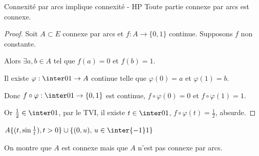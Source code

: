 \begin{proposition}{Connexité par arcs implique connexité - HP}{}
    Toute partie connexe par arcs est connexe. 
\end{proposition}

\begin{proof}
    Soit $A \subset E$ connexe par arcs et $f : A \to \{0, 1\}$ continue. Supposons $f$ non constante. 

    Alors $\exists a, b \in A$ tel que $f(a) = 0$ et $f(b) = 1$.

    Il existe $\varphi : \inter 0 1 \to A$ continue telle que $\varphi(0) = a$ et $\varphi(1) = b$.

    Donc $f \circ \varphi : \inter 0 1 \to \{0, 1\}$ est continue, $f \circ \varphi(0) = 0$ et $f \circ \varphi (1) = 1$. 

    Or $\frac 1 2 \in \inter 0 1$, par le TVI, il existe $t \in \inter 0 1$, $f \circ \varphi (t) = \frac 1 2$, absurde. 
    
\end{proof}

\begin{exemple}
    $A \{(t, \sin \frac 1 t), t > 0\} \cup \{(0, u), \, u \in \inter {-1} 1\}$

    On montre que $A$ est connexe mais que $A$ n'est pas connexe par arcs.
\end{exemple}
